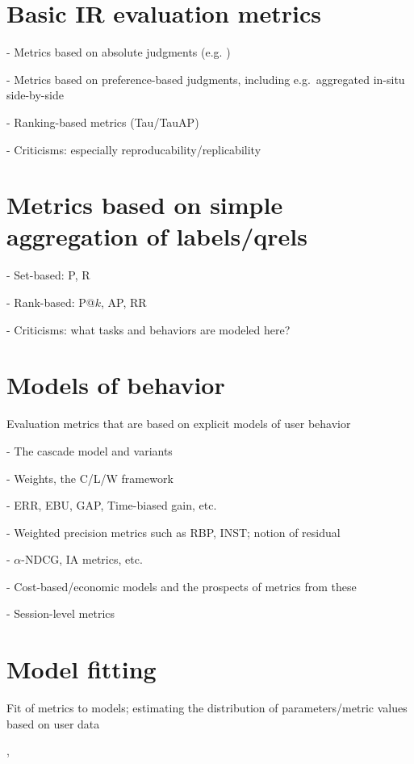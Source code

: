 \documentclass[openany]{now} %
\begin{document}
\section{Basic IR evaluation metrics}

- Metrics based on absolute judgments (e.g. \cite{cooper73selecting})

- Metrics based on preference-based judgments, including e.g.\ aggregated in-situ side-by-side \cite{Thomas2006}

- Ranking-based metrics (Tau/TauAP)

- Criticisms: especially reproducability/replicability

\section{Metrics based on simple aggregation of labels/qrels}

- Set-based: P, R

- Rank-based: P@$k$, AP, RR

- Criticisms: what tasks and behaviors are modeled here?

\section{Models of behavior}

Evaluation metrics that are based on explicit models of user behavior

- The cascade model and variants

- Weights, the C/L/W framework \citep{Moffat2013}

- ERR, EBU, GAP, Time-biased gain, etc.

- Weighted precision metrics such as RBP, INST; notion of residual \citep{Moffat08,Moffat15}

- $\alpha$-NDCG, IA metrics, etc.

- Cost-based/economic models and the prospects of metrics from these

- Session-level metrics \cite{kanoulas2011evaluating} \cite{Järvelin2008}

\section{Model fitting}

Fit of metrics to models; estimating the distribution of parameters/metric values based on user data

\cite{CarteretteKY11}, \cite{Moffat2013}
\end{document}
